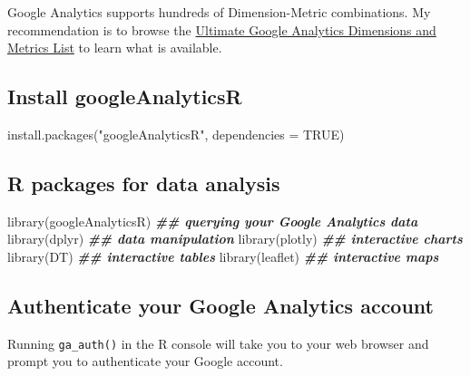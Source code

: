 \documentclass[
]{book}
\newenvironment{Shaded}{\begin{snugshade}}{\end{snugshade}}
\newcommand{\AttributeTok}[1]{\textcolor[rgb]{0.77,0.63,0.00}{#1}}
\newcommand{\ConstantTok}[1]{\textcolor[rgb]{0.00,0.00,0.00}{#1}}
\newcommand{\DocumentationTok}[1]{\textcolor[rgb]{0.56,0.35,0.01}{\textbf{\textit{#1}}}}
\newcommand{\FunctionTok}[1]{\textcolor[rgb]{0.00,0.00,0.00}{#1}}
\newcommand{\NormalTok}[1]{#1}
\newcommand{\StringTok}[1]{\textcolor[rgb]{0.31,0.60,0.02}{#1}}
\begin{document}
Google Analytics supports hundreds of Dimension-Metric combinations. My recommendation is to browse the \href{https://www.ovrdrv.com/blog/ultimate-google-analytics-dimensions-and-metrics-list/}{Ultimate Google Analytics Dimensions and Metrics List} to learn what is available.

\hypertarget{install-googleanalyticsr}{%
\subsection{Install googleAnalyticsR}\label{install-googleanalyticsr}}

\begin{Shaded}
\begin{Highlighting}[]
\FunctionTok{install.packages}\NormalTok{(}\StringTok{"googleAnalyticsR"}\NormalTok{, }\AttributeTok{dependencies =} \ConstantTok{TRUE}\NormalTok{)}
\end{Highlighting}
\end{Shaded}

\hypertarget{r-packages-for-data-analysis}{%
\subsection{R packages for data analysis}\label{r-packages-for-data-analysis}}

\begin{Shaded}
\begin{Highlighting}[]
\FunctionTok{library}\NormalTok{(googleAnalyticsR)  }\DocumentationTok{\#\# querying your Google Analytics data}
\FunctionTok{library}\NormalTok{(dplyr)             }\DocumentationTok{\#\# data manipulation}
\FunctionTok{library}\NormalTok{(plotly)            }\DocumentationTok{\#\# interactive charts}
\FunctionTok{library}\NormalTok{(DT)                }\DocumentationTok{\#\# interactive tables}
\FunctionTok{library}\NormalTok{(leaflet)           }\DocumentationTok{\#\# interactive maps}
\end{Highlighting}
\end{Shaded}

\hypertarget{authenticate-your-google-analytics-account}{%
\subsection{Authenticate your Google Analytics account}\label{authenticate-your-google-analytics-account}}

Running \texttt{ga\_auth()} in the R console will take you to your web browser and prompt you to authenticate your Google account.
\end{document}

